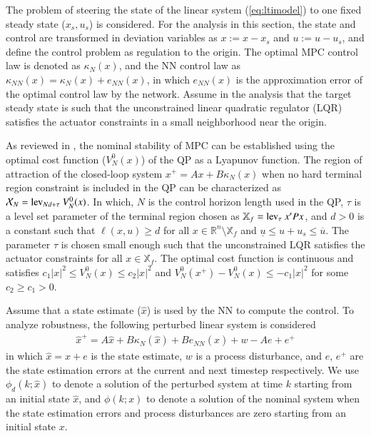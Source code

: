 \documentclass[preprint,5p, twocolumn, authoryear]{elsarticle}
\newcommand{\bbR}{\mathbb{R}}
\newcommand{\bbX}{\mathbb{X}}
\begin{document}
The problem of steering the state of the linear 
system (\ref{eq:ltimodel}) 
to one fixed steady state ($x_s, u_s$) is considered. 
For the analysis in this section, 
the state and control are transformed in deviation variables 
as $x := x - x_s$ and $u := u -u_s$,
and define the control problem as regulation to the origin.
The optimal MPC control law is denoted as $\kappa_N(x)$, 
and the NN control law as
$\kappa_{NN}(x) = \kappa_N(x) + e_{NN}(x)$, in which 
$e_{NN}(x)$ is the approximation error 
of the optimal control law by the network. Assume 
in the analysis that the target steady state 
is such that the unconstrained linear quadratic regulator (LQR)
satisfies the actuator constraints 
in a small neighborhood near the origin. 

As reviewed in \cite*{mayne:rawlings:rao:scokaert:2000},
the nominal stability of MPC can be established
using the optimal cost function ($V_N^0(x)$) of the QP
as a Lyapunov function.
The region of attraction of the closed-loop system 
$x^+ = Ax + B\kappa_N(x)$ when no hard terminal region 
constraint \citep*{limon:alamo:salas:camacho:2006}  
is included in the QP can be characterized
as $\mathcal{X}_N = \textnormal{lev}_{Nd + \tau} \ V_N^0(x)$.
In which, $N$ is the control 
horizon length used in the QP, $\tau$ is a level
set parameter of the terminal region chosen as
$\bbX_f = \textnormal{lev}_{\tau} \ x'Px$, and $d > 0$
is a constant such that $\ell(x, u) \geq d$ for all 
$x \in \bbR^n \setminus \bbX_f$ and 
$\underline{u} \leq u+u_s \leq \overline{u}$.
The parameter $\tau$ is chosen small enough such that
the unconstrained LQR satisfies the actuator constraints 
for all $x \in \bbX_f$. The optimal cost 
function is continuous and satisfies 
$c_1\vert x \vert^2 \leq V_N^0(x) \leq c_2\vert x \vert^2$
and $V_N^0(x^+) - V_N^0(x) \leq -c_1\vert x \vert^2$ 
for some $c_2 \geq c_1 > 0$.

Assume that a state estimate ($\hat{x}$) is
used by the NN to compute the control. 
To analyze robustness, the following perturbed
linear system is considered
\begin{align} \label{eq:perturbed_sys}
    \hat{x}^+ = A\hat{x} + B\kappa_N(\hat{x}) + Be_{NN}(\hat{x}) + w - Ae + e^+
\end{align}
in which $\hat{x} = x + e$ is the state estimate, 
$w$ is a process disturbance, 
and $e$, $e^+$ are the state estimation errors at the 
current and next timestep respectively. 
We use $\phi_d(k;\hat{x})$ to denote a 
solution of the perturbed system 
at time $k$ starting from an initial state $\hat{x}$,
and $\phi(k;x)$ to denote a solution 
of the nominal system when the state estimation errors and process
disturbances are zero starting 
from an initial state $x$.
\end{document}
